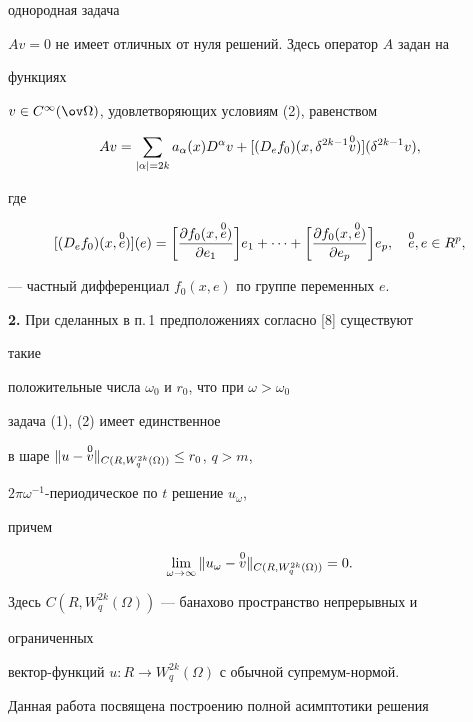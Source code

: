 однородная задача 


$A v=0$ не имеет отличных от нуля решений. Здесь оператор $A$ задан на 


функциях 


$v\in C^\infty(\ov\Omega)$, удовлетворяющих условиям (2), равенством 


$$ 


A v=\sum_{|\alpha|=2k}a_\alpha(x)D^\alpha v+[(D_e f_0) 


(x,\delta^{2k-1}\up{0}{v})](\delta^{2k-1}v), 


$$ 


где 


$$ 


[(D_e f_0)(x,\up{0}{e})](e)=\bigg[\frac{\partial f_0 


(x,\up{0}{e})}{\partial e_1}\bigg]e_1+\dotsb+\bigg[ 


\frac{\partial f_0(x,\up{0}{e})}{\partial e_p}\bigg]e_p,\quad 


\up{0}{e},e\in R^p,


$$ 


--- частный дифференциал $f_0(x,e)$ по группе переменных $e$. 


\medskip 


 


{\bf 2.} При сделанных в п.\,1 предположениях согласно [8] существуют 


такие  


положительные числа $\omega_0$ и $r_0$, что при $\omega>\omega_0$ 


задача (1), (2) имеет единственное 


в шаре $\|u-\overset{0}{v}{}\|_{C(R,W^{2k}_q(\Omega))}\le r_0$, $q>m$, 


$2\pi\omega^{-1}$-периодическое по $t$ решение $u_\omega$, 


причем 


$$ 


\lim_{\omega\to\infty}\|u_\omega-\up{0}{v} 


\|_{C(R,W^{2k}_q(\Omega))}=0. 


$$ 


Здесь $C(R,W^{2k}_q(\Omega))$ --- банахово пространство непрерывных и 


ограниченных 


вектор-функций $u:R\to W^{2k}_q(\Omega)$ с обычной супремум-нормой. 


 


Данная работа посвящена построению полной асимптотики решения 


